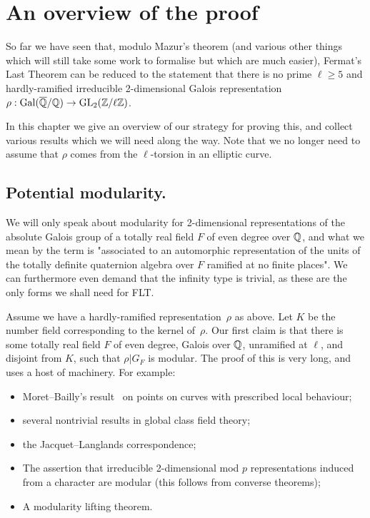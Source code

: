 \chapter{An overview of the proof}\label{ch_overview}

So far we have seen that, modulo Mazur's theorem (and various other things which will still take some work to formalise but which are much easier), Fermat's Last Theorem can be reduced
to the statement that there is no prime $\ell\geq 5$ and hardly-ramified
irreducible 2-dimensional Galois representation $\rho:\operatorname{Gal}(\overline{\mathbb{Q}}/\mathbb{Q})\to\operatorname{GL}_2(\mathbb{Z}/\ell\mathbb{Z})$.

In this chapter we give an overview of our strategy for proving this, and collect
various results which we will need along the way. Note that we no longer need to assume that $\rho$ comes from the $\ell$-torsion in an elliptic curve.

\section{Potential modularity.}

We will only speak about modularity for 2-dimensional representations of the
absolute Galois group of a totally real field $F$ of even degree over $\mathbb{Q}$, and
what we mean by the term is "associated to an automorphic representation of the
units of the totally definite quaternion algebra over $F$ ramified at no finite places".
We can furthermore even demand that the infinity type is trivial, as these are the only
forms we shall need for FLT.

Assume we have a hardly-ramified representation~$\rho$ as above. Let $K$
be the number field corresponding to the kernel of~$\rho$. Our first claim
is that there is some totally real field $F$ of even degree, Galois over $\mathbb{Q}$,
unramified at $\ell$, and disjoint from $K$, such that $\rho|G_F$ is modular. 
The proof of this is very long, and uses a host of machinery. For example:
\begin{itemize}
    \item Moret--Bailly's result~\cite{moret-bailly} on points on curves with prescribed 
    local behaviour;
    \item several nontrivial results in global class field theory;
    \item the Jacquet--Langlands correspondence;
    \item The assertion that irreducible 2-dimensional mod $p$ representations induced from a character are modular (this follows from converse theorems);
    \item A modularity lifting theorem.
\end{itemize}

